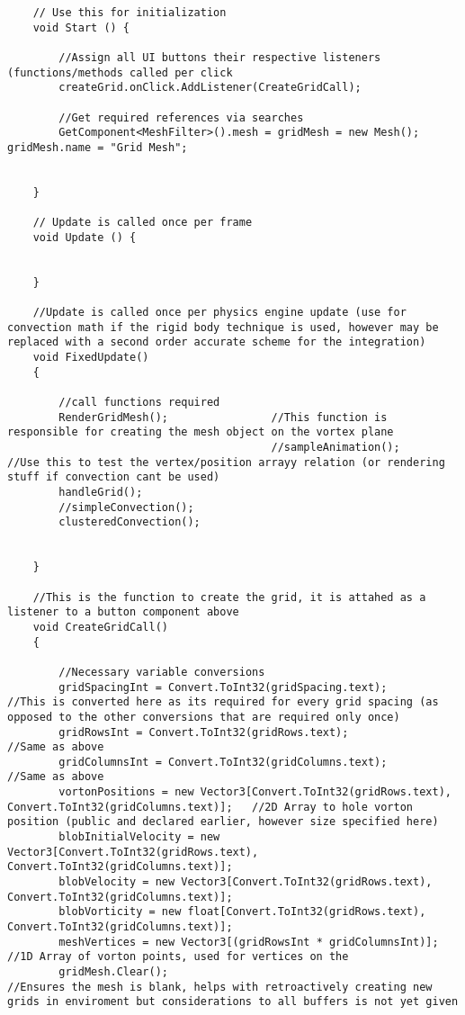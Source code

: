 \begin{mdframed}[linecolor=black, topline=true, bottomline=true,
  leftline=false, rightline=false]
\begin{verbatim}
	// Use this for initialization
	void Start () {

        //Assign all UI buttons their respective listeners (functions/methods called per click
        createGrid.onClick.AddListener(CreateGridCall);

        //Get required references via searches
        GetComponent<MeshFilter>().mesh = gridMesh = new Mesh();    gridMesh.name = "Grid Mesh";


    }
	
	// Update is called once per frame
	void Update () {


    }

    //Update is called once per physics engine update (use for convection math if the rigid body technique is used, however may be replaced with a second order accurate scheme for the integration)
    void FixedUpdate()
    {

        //call functions required
        RenderGridMesh();                //This function is responsible for creating the mesh object on the vortex plane
                                         //sampleAnimation();            //Use this to test the vertex/position arrayy relation (or rendering stuff if convection cant be used)
        handleGrid();
        //simpleConvection();
        clusteredConvection();
        

    }

    //This is the function to create the grid, it is attahed as a listener to a button component above
    void CreateGridCall()
    {

        //Necessary variable conversions
        gridSpacingInt = Convert.ToInt32(gridSpacing.text);                                                 //This is converted here as its required for every grid spacing (as opposed to the other conversions that are required only once)
        gridRowsInt = Convert.ToInt32(gridRows.text);                                                       //Same as above
        gridColumnsInt = Convert.ToInt32(gridColumns.text);                                                 //Same as above
        vortonPositions = new Vector3[Convert.ToInt32(gridRows.text), Convert.ToInt32(gridColumns.text)];   //2D Array to hole vorton position (public and declared earlier, however size specified here)
        blobInitialVelocity = new Vector3[Convert.ToInt32(gridRows.text), Convert.ToInt32(gridColumns.text)];
        blobVelocity = new Vector3[Convert.ToInt32(gridRows.text), Convert.ToInt32(gridColumns.text)];
        blobVorticity = new float[Convert.ToInt32(gridRows.text), Convert.ToInt32(gridColumns.text)];
        meshVertices = new Vector3[(gridRowsInt * gridColumnsInt)];                                         //1D Array of vorton points, used for vertices on the 
        gridMesh.Clear();                                                                                   //Ensures the mesh is blank, helps with retroactively creating new grids in enviroment but considerations to all buffers is not yet given


\end{verbatim}
\end{mdframed}
